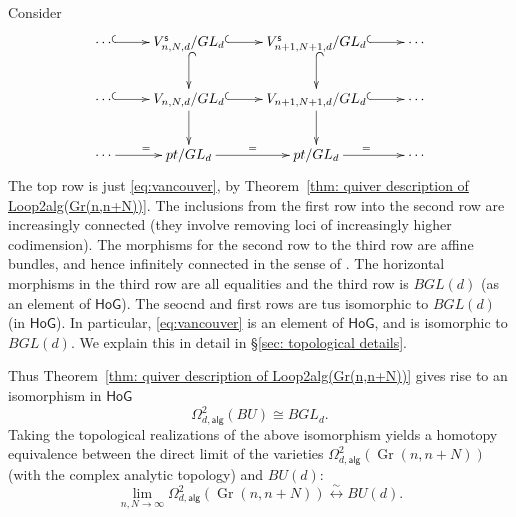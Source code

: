 \documentclass{amsart}
\theoremstyle{definition}
\newcommand{\HoG}{\textsf{HoG}}
\newcommand{\alg}{\mathsf{alg}}
\newcommand{\stable}{\mathsf{s}}
\newcommand{\Gr}{\operatorname{Gr}}
\newcommand{\LoopTwo}{\Omega^{2}_{d,\alg}}
\newcommand{\homotopyeq}{\overset \sim \longleftrightarrow}
\begin{document}
Consider
$$\xymatrix{
\dotsb  \ar@{^(->}[r] &  V^{\stable}_{n,N,d}/GL_{d} \ar@{^(->}[d]  \ar@{^(->}[r] &
V^{\stable}_{n+1,N+1,d}/GL_{d} \ar@{^(->}[r] \ar@{^(->}[d]  & \dotsb \\
\dotsb   \ar@{^(->}[r]&  V_{n,N,d}/GL_{d} \ar[d]  \ar@{^(->}[r] &
V_{n+1,N+1,d}/GL_{d} \ar@{^(->}[r] \ar[d]  & \dotsb \\
\dotsb  \ar[r]^=  &  pt/GL_{d}  \ar[r]^= &
pt/GL_{d}  \ar[r]^=   & \dotsb \\
}
$$
The top row is just \eqref{eq:vancouver}, by Theorem~\ref{thm: quiver description of Loop2alg(Gr(n,n+N))}.  The inclusions from the first row into the second row are increasingly connected (they involve removing loci of increasingly higher codimension).  The morphisms for the second row to the third row are affine bundles, and hence infinitely connected in the sense of \cite{Larson-Vakil-BottPeriodicity}.  The horizontal morphisms in the third row are all equalities and the third row is $BGL(d)$ (as an element of $\HoG$).  The seocnd and first rows are tus isomorphic to $BGL(d)$ (in $\HoG$).  In particular, \eqref{eq:vancouver} is an element of $\HoG$, and is isomorphic to $BGL(d)$.  We explain this in detail in \S \ref{sec: topological details}.

Thus
Theorem~\ref{thm: quiver description of Loop2alg(Gr(n,n+N))} gives
rise to an isomorphism in $\HoG$
\[
\LoopTwo (BU)\cong BGL_{d}. 
\]
Taking the topological realizations of the above isomorphism yields a
homotopy equivalence between the direct limit of the varieties $\LoopTwo
(\Gr (n,n+N))$ (with the complex analytic topology) and $BU(d)$:
\[
\lim_{n,N\to \infty} \LoopTwo (\Gr (n,n+N)) \homotopyeq BU(d).
\]
\end{document}
